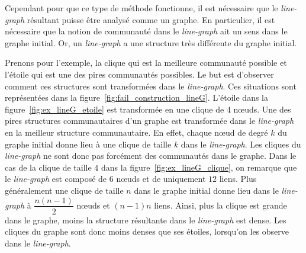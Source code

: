 Cependant pour que ce type de méthode fonctionne, il est nécessaire que le \emph{line-graph} résultant puisse être analysé comme un graphe.
En particulier, il est nécessaire que la notion de communauté dans le \emph{line-graph} ait un sens dans le graphe initial.
Or, un \emph{line-graph} a une structure très différente du graphe initial.


Prenons pour l'exemple, la clique qui est la meilleure communauté possible et l'étoile qui est une des pires communautés possibles.
Le but est d'observer comment ces structures sont transformées dans le \emph{line-graph}.
Ces situations sont représentées dans la figure~\ref{fig:fail_construction_lineG}.
L'étoile dans la figure~\ref{fig:ex_lineG_etoile} est transformée en une clique de 4 n\oe{}uds.
Une des pires structures communautaires d'un graphe est transformée dans le \emph{line-graph} en la meilleur structure communautaire.
En effet, chaque n\oe{}ud de degré $k$ du graphe initial donne lieu à une clique de taille $k$ dans le \emph{line-graph}.
Les cliques du \emph{line-graph} ne sont donc pas forcément des communautés dans le graphe.
Dans le cas de la clique de taille $4$ dans la figure~\ref{fig:ex_lineG_clique}, on remarque que le \emph{line-graph} est composé de $6$ n\oe{}uds et de uniquement $12$ liens.
Plus généralement une clique de taille $n$ dans le graphe initial donne lieu dans le \emph{line-graph} à $\dfrac{n(n-1)}{2}$ n\oe{}uds et $(n-1)n$ liens.
Ainsi, plus la clique est grande dans le graphe, moins la structure résultante dans le \emph{line-graph} est dense.
Les cliques du graphe sont donc moins denses que ses étoiles, lorsqu'on les observe dans le \emph{line-graph}.

